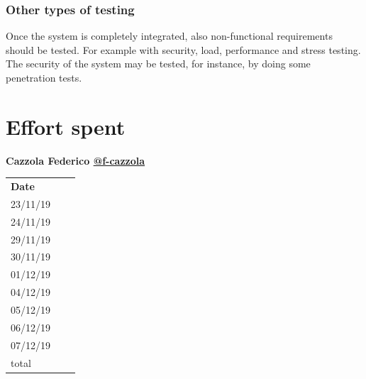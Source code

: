 \documentclass{article}
\begin{document}
\subsubsection{Other types of testing}
Once the system is completely integrated, also non-functional requirements should be tested.
For example with security, load, performance and stress testing. \\
The security of the system may be tested, for instance, by doing some penetration tests.

\newpage
\section{Effort spent}
	\begin{center}
		{\bf Cazzola Federico \href{https://github.com/f-cazzola}{@f-cazzola} }
		\vspace{2mm}

			\begin{tabular}{p{1.3cm}|p{1.8cm}|p{6.7cm}}
				\hline
				\bf Date & \bf \makebox[1.8cm][c]{Hours} & \bf \makebox[6.7cm][c]{Description} \\
				23/11/19 & \makebox[1.8cm][c]{2} & \makebox[6.7cm][c]{Architectural design}\\
				24/11/19 & \makebox[1.8cm][c]{3} & \makebox[6.7cm][c]{Architectural design}\\
				29/11/19 & \makebox[1.8cm][c]{2} & \makebox[6.7cm][c]{Architectural design}\\
				30/11/19 & \makebox[1.8cm][c]{6} & \makebox[6.7cm][c]{Architectural design}\\
				01/12/19 & \makebox[1.8cm][c]{8} & \makebox[6.7cm][c]{Architectural design}\\
				04/12/19 & \makebox[1.8cm][c]{4} & \makebox[6.7cm][c]{UI design}\\
				05/12/19 & \makebox[1.8cm][c]{6} & \makebox[6.7cm][c]{UI design and UX}\\
				06/12/19 & \makebox[1.8cm][c]{4.3} & \makebox[6.7cm][c]{UI design and UX}\\
				07/12/19 & \makebox[1.8cm][c]{8} & \makebox[6.7cm][c]{Interfaces, General improvements}\\
				\hline
				total    & \makebox[1.8cm][c]{43.3}
			\end{tabular}
	\end{center}
	\vspace{1cm}
\end{document}
